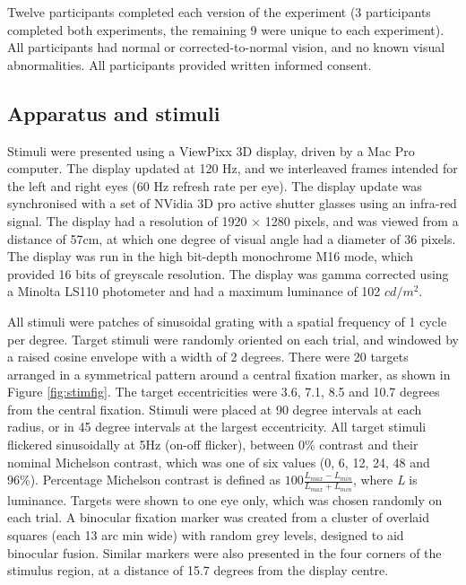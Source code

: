 \documentclass[]{article}
\begin{document}
Twelve participants completed each version of the experiment (3 participants completed both experiments, the remaining 9 were unique to each experiment). All participants had normal or corrected-to-normal vision, and no known visual abnormalities. All participants provided written informed consent.

\hypertarget{apparatus-and-stimuli}{%
\subsection{Apparatus and stimuli}\label{apparatus-and-stimuli}}

Stimuli were presented using a ViewPixx 3D display, driven by a Mac Pro computer. The display updated at 120 Hz, and we interleaved frames intended for the left and right eyes (60 Hz refresh rate per eye). The display update was synchronised with a set of NVidia 3D pro active shutter glasses using an infra-red signal. The display had a resolution of 1920 \(\times\) 1280 pixels, and was viewed from a distance of 57cm, at which one degree of visual angle had a diameter of 36 pixels. The display was run in the high bit-depth monochrome M16 mode, which provided 16 bits of greyscale resolution. The display was gamma corrected using a Minolta LS110 photometer and had a maximum luminance of 102 \(cd/m^2\).

All stimuli were patches of sinusoidal grating with a spatial frequency of 1 cycle per degree. Target stimuli were randomly oriented on each trial, and windowed by a raised cosine envelope with a width of 2 degrees. There were 20 targets arranged in a symmetrical pattern around a central fixation marker, as shown in Figure \ref{fig:stimfig}. The target eccentricities were 3.6, 7.1, 8.5 and 10.7 degrees from the central fixation. Stimuli were placed at 90 degree intervals at each radius, or in 45 degree intervals at the largest eccentricity. All target stimuli flickered sinusoidally at 5Hz (on-off flicker), between 0\% contrast and their nominal Michelson contrast, which was one of six values (0, 6, 12, 24, 48 and 96\%). Percentage Michelson contrast is defined as \(100\frac{L_{max}-L_{min}}{L_{max}+L_{min}}\), where \emph{L} is luminance. Targets were shown to one eye only, which was chosen randomly on each trial. A binocular fixation marker was created from a cluster of overlaid squares (each 13 arc min wide) with random grey levels, designed to aid binocular fusion. Similar markers were also presented in the four corners of the stimulus region, at a distance of 15.7 degrees from the display centre.
\end{document}
